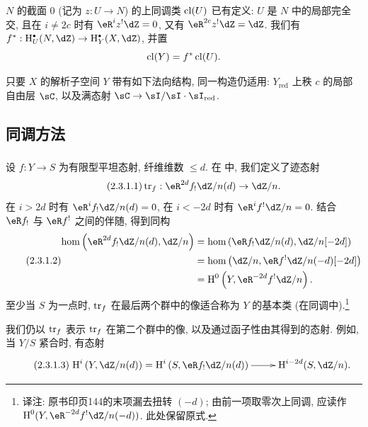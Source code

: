 $N$ 的截面 $0$ (记为 $z:U\to N$) 的上同调类 $\operatorname{cl}(U)$ 已有定义:
$U$ 是 $N$ 中的局部完全交, 且在 $i\ne 2 c$ 时有 $\eR^i z^!\dZ = 0$,
又有 $\eR^{2 c} z^!\dZ = \dZ$.
我们有 $f^*:\h_U^\bullet(N,\dZ) \to \h_Y^\bullet(X,\dZ)$, 并置
\[
  \operatorname{cl}(Y) = f^*\operatorname{cl}(U) \text{.}
\]

只要 $X$ 的解析子空间 $Y$ 带有如下法向结构, 同一构造仍适用:
$Y_\text{red}$ 上秩 $c$ 的局部自由层 $\sC$, 以及满态射
$\sC\to \sI/\sI\cdot \sI_\text{red}$.

\subsection{同调方法}\label{IV:2-3}

\subsubsection{}\label{IV:2-3-1}

设 $f:Y\to S$ 为有限型平坦态射, 纤维维数 $\leqslant d$.
在 \cite[XVIII 2.9]{sga4} 中, 我们定义了迹态射
\begin{equation*}\tag{2.3.1.1}\label{IV:eq:2-3-1-1}
  \tr_f:\eR^{2 d} f_! \dZ/n(d) \to \dZ/n \text{.}
\end{equation*}
在 $i>2 d$ 时有 $\eR^i f_!\dZ/n(d)=0$,
在 $i<-2 d$ 时有 $\eR^i f^!\dZ/n=0$.
结合 $\eR f_!$ 与 $\eR f^!$ 之间的伴随, 得到同构
\begin{equation*}\tag{2.3.1.2}\label{IV:eq:2-3-1-2}
\begin{aligned}
  \hom\left(\eR^{2 d}f_!\dZ/n(d),\dZ/n\right)
    &= \hom\left(\eR f_!\dZ/n(d),\dZ/n[-2 d]\right) \\
    &= \hom\left(\dZ/n,\eR f^!\dZ/n(-d)[-2 d]\right) \\
    &= \h^0\left(Y,\eR^{-2 d}f^!\dZ/n\right) \text{.}
\end{aligned}
\end{equation*}
至少当 $S$ 为一点时, $\operatorname{tr}_f$ 在最后两个群中的像适合称为 $Y$ 的基本类 (在同调中).\footnote{译注: 原书印页144的末项漏去扭转 $(-d)$; 由前一项取零次上同调, 应读作 $\h^0(Y,\eR^{-2d}f^!\dZ/n(-d))$. 此处保留原式.}

我们仍以 $\operatorname{tr}_f$ 表示 $\operatorname{tr}_f$ 在第二个群中的像,
以及通过函子性由其得到的态射. 例如, 当 $Y/S$ 紧合时, 有态射
\begin{equation*}\tag{2.3.1.3}\label{IV:eq:2-3-1-3}
\xymatrix{
  \h^i\left(Y,\dZ/n(d)\right) = \h^i\left(S,\eR f_!\dZ/n(d)\right) \ar[r]
    & \h^{i-2 d}(S,\dZ/n) \text{.}
}
\end{equation*}


